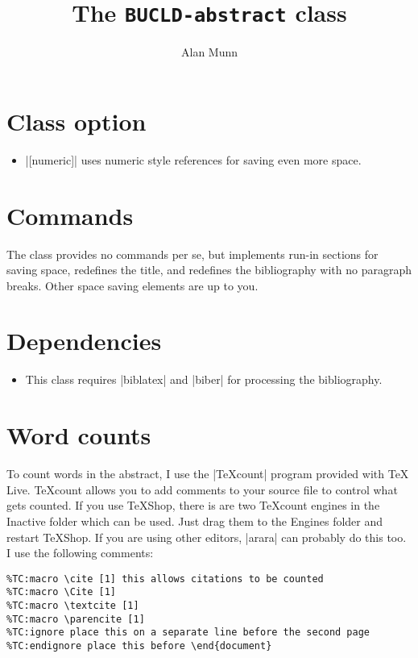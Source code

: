 \documentclass[12pt]{article}
\title{The \texttt{BUCLD-abstract} class}
\author{Alan Munn}
\begin{document}
\maketitle
\section{Class option}
\begin{itemize}
\item |[numeric]| uses numeric style references for saving even more space.
\end{itemize}
\section{Commands}
The class provides no commands per se, but implements run-in sections for saving space, redefines the title, and redefines the bibliography with no paragraph breaks.  Other space saving elements are up to you.

\section{Dependencies}
\begin{itemize}
\item This class requires |biblatex| and |biber| for processing the bibliography.
\end{itemize}
\section{Word counts}
To count words in the abstract, I use the |TeXcount| program provided with TeX Live. TeXcount allows you to add comments to your source file to control what gets counted. If you use TeXShop, there is are two TeXcount engines in the Inactive folder which can be used. Just drag them to the Engines folder and restart TeXShop.  If you are using other editors, |arara| can probably do this too.  I use the following comments:
\begin{Verbatim}
%TC:macro \cite [1] this allows citations to be counted
%TC:macro \Cite [1]
%TC:macro \textcite [1]
%TC:macro \parencite [1]
%TC:ignore place this on a separate line before the second page
%TC:endignore place this before \end{document}
\end{Verbatim}
\end{document}

